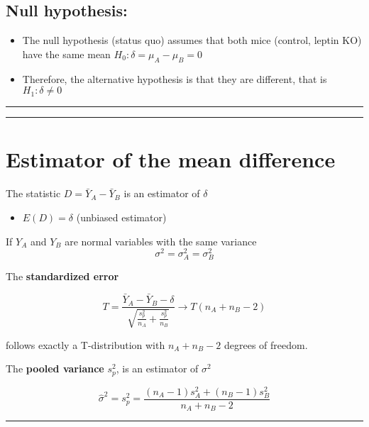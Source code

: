\documentclass[
]{book}
\providecommand{\tightlist}{%
  \setlength{\itemsep}{0pt}\setlength{\parskip}{0pt}}
\begin{document}
\hypertarget{null-hypothesis-5}{%
\subsection{Null hypothesis:}\label{null-hypothesis-5}}

\begin{itemize}
\item
  The null hypothesis (status quo) assumes that both mice (control, leptin KO) have the same mean \(H_0: \delta=\mu_A-\mu_B=0\)
\item
  Therefore, the alternative hypothesis is that they are different, that is \(H_1: \delta \neq 0\)
\end{itemize}

\begin{center}\rule{0.5\linewidth}{0.5pt}\end{center}

\begin{center}\rule{0.5\linewidth}{0.5pt}\end{center}

\hypertarget{estimator-of-the-mean-difference}{%
\section{Estimator of the mean difference}\label{estimator-of-the-mean-difference}}

The statistic \(D=\bar{Y}_A-\bar{Y}_B\) is an estimator of \(\delta\)

\begin{itemize}
\tightlist
\item
  \(E(D)=\delta\) (unbiased estimator)
\end{itemize}

If \(Y_A\) and \(Y_B\) are normal variables with the same variance \[\sigma^2=\sigma^2_A=\sigma^2_B\]

The \textbf{standardized error}

\[T=\frac{\bar{Y}_A-\bar{Y}_B -\delta}{\sqrt{\frac{s_p^2}{n_A}+\frac{s_p^2}{n_B}}} \rightarrow T(n_A+n_B-2)\]

follows exactly a T-distribution with \(n_A+n_B-2\) degrees of freedom.

The \textbf{pooled variance} \(s_p^2\), is an estimator of \(\sigma^2\)

\[\hat{\sigma}^2=s_p^2= \frac{(n_A-1) s^2_A+(n_B-1) s^2_B}{n_A+n_B-2}\]

\begin{center}\rule{0.5\linewidth}{0.5pt}\end{center}
\end{document}

